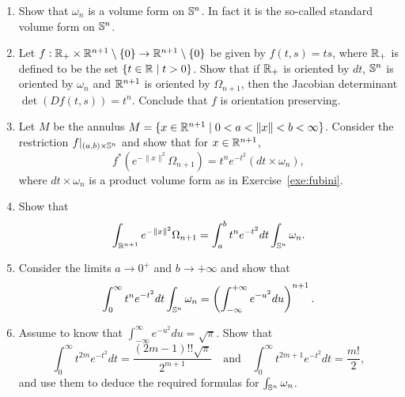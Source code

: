 \begin{exercise}
	\begin{enumerate}
		\item Show that $\omega_n$ is a volume form on $\mathbb{S}^n$. In fact it is the so-called standard volume form on $\mathbb{S}^n$.
		\item Let $f:\mathbb{R}_+\times\mathbb{R}^{n+1}\setminus\{0\}\to \mathbb{R}^{n+1}\setminus\{0\}$ be given by $f(t,s) = ts$, where $\mathbb{R}_+$ is defined to be the set $\{t\in\mathbb{R} \mid t >0\}$.
		      Show that if $\mathbb{R}_+$ is oriented by $dt$, $\mathbb{S}^n$ is oriented by $\omega_n$ and $\mathbb{R}^{n+1}$ is oriented by $\Omega_{n+1}$, then the Jacobian determinant $\det(Df(t,s))= t^n$.
		      Conclude that $f$ is orientation preserving.
		\item Let $M$ be the annulus $M = \{x\in\mathbb{R}^{n+1} \mid 0<a<\|x\|<b<\infty\}$. Consider the restriction $f|_{(a,b)\times \mathbb{S}^n}$ and show that for $x\in\mathbb{R}^{n+1}$,
		      \begin{equation}
			      f^*\left(e^{-\|x\|^2}\Omega_{n+1}\right) = t^n e^{-t^2}(dt \times \omega_n),
		      \end{equation}
		      where $dt\times\omega_n$ is a product volume form as in Exercise~\ref{exe:fubini}.
		\item Show that
		      \begin{equation}
			      \int_{\mathbb{R}^{n+1}}e^{-\|x\|^2}\Omega_{n+1} = \int_a^b t^ne^{-t^2} dt \int_{\mathbb{S}^n}\omega_n.
		      \end{equation}
		\item Consider the limits $a\to0^+$ and $b\to+\infty$ and show that
		      \begin{equation}
			      \int_0^\infty t^n e^{-t^2} dt \int_{\mathbb{S}^n}\omega_n = \left(\int_{-\infty}^{+\infty} e^{-u^2} du\right)^{n+1}.
		      \end{equation}
		\item Assume to know that $\int_{-\infty}^{\infty} e^{-u^2}du = \sqrt{\pi}$. Show that
		      \begin{equation}
			      \int_0^\infty t^{2m} e^{-t^2}dt = \frac{(2m-1)!!\sqrt{\pi}}{2^{m+1}}
			      \quad\mbox{and}\quad
			      \int_0^\infty t^{2m+1} e^{-t^2}dt = \frac{m!}{2},
		      \end{equation}
		      and use them to deduce the required formulas for $\int_{\mathbb{S}^n}\omega_n$.
	\end{enumerate}
\end{exercise}

